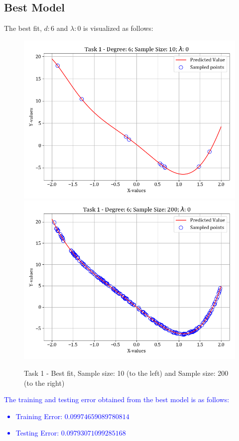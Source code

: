 \documentclass[12pt,a4paper]{article}
\newcommand{\noi}{\noindent}
\begin{document}
\subsection{Best Model}
The best fit, $d:6$ and $\lambda:0$ is visualized as follows:
\begin{figure}[H]
    \hspace{-2em}
    \includegraphics[scale=0.45]{images/t1_d1/d_6_size_10_l_0.png}
    \includegraphics[scale=0.45]{images/t1_d1/d_6_size_200_l_0.png}
    \caption{Task 1 - Best fit, Sample size: 10 (to the left) and Sample size: 200 (to the right)}
\end{figure}

\noi
\textcolor{blue}{
The training and testing error obtained from the best model is as follows:
\begin{itemize}
    \itemsep0em
    \item Training Error: $0.09974659089780814$
    \item Testing Error: $0.09793071099285168$
\end{itemize}
}
\end{document}
